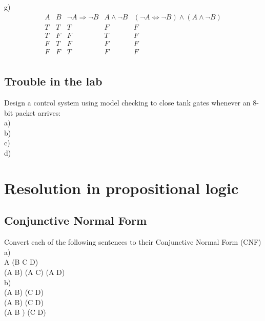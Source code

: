 \documentclass{article}
\begin{document}
g)\\
\begin{displaymath}
\begin{array}{|c|c|c|c|c|c}

A & 
B & 
\neg A \Rightarrow \neg B & 
A \wedge \neg B &
(\neg A \Leftrightarrow \neg B) \wedge (A \wedge \neg B)\\ %
\hline  %
T & T & T & F & F\\
T & F & F & T & F\\
F & T & F & F & F\\
F & F & T & F & F\\

\end{array}
\end{displaymath}

\subsection{Trouble in the lab}

Design a control system using model checking to close tank gates whenever an 8-bit packet arrives:\\

a)\\

b)\\

c)\\

d)\\

\section{Resolution in propositional logic}

\subsection{Conjunctive Normal Form}

Convert each of the following sentences to their Conjunctive Normal Form (CNF)\\

a)\\
A \vee (B \wedge C \wedge \neg D)\\
(A \vee B) \wedge (A \vee C) \wedge (A \vee \neg D)\\

b)\\
\neg (A \Rightarrow \neg B) \wedge \neg (C \Rightarrow \neg D)\\
\neg (\neg A \vee \neg B) \wedge \neg (\neg C \vee \neg D)\\
(A \vee B ) \wedge (C \vee D)\\
\end{document}
